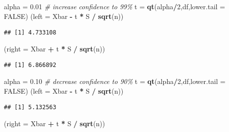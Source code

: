 \documentclass[
]{book}
\newenvironment{Shaded}{\begin{snugshade}}{\end{snugshade}}
\newcommand{\AttributeTok}[1]{\textcolor[rgb]{0.13,0.29,0.53}{#1}}
\newcommand{\CommentTok}[1]{\textcolor[rgb]{0.56,0.35,0.01}{\textit{#1}}}
\newcommand{\ConstantTok}[1]{\textcolor[rgb]{0.56,0.35,0.01}{#1}}
\newcommand{\DecValTok}[1]{\textcolor[rgb]{0.00,0.00,0.81}{#1}}
\newcommand{\FloatTok}[1]{\textcolor[rgb]{0.00,0.00,0.81}{#1}}
\newcommand{\FunctionTok}[1]{\textcolor[rgb]{0.13,0.29,0.53}{\textbf{#1}}}
\newcommand{\NormalTok}[1]{#1}
\newcommand{\OtherTok}[1]{\textcolor[rgb]{0.56,0.35,0.01}{#1}}
\newcommand{\SpecialCharTok}[1]{\textcolor[rgb]{0.81,0.36,0.00}{\textbf{#1}}}
\begin{document}
\begin{Shaded}
\begin{Highlighting}[]
\NormalTok{alpha }\OtherTok{=} \FloatTok{0.01} \CommentTok{\# increase confidence to 99\%}
\NormalTok{t }\OtherTok{=} \FunctionTok{qt}\NormalTok{(alpha}\SpecialCharTok{/}\DecValTok{2}\NormalTok{,df,}\AttributeTok{lower.tail =} \ConstantTok{FALSE}\NormalTok{)}
\NormalTok{(}\AttributeTok{left =}\NormalTok{ Xbar }\SpecialCharTok{{-}}\NormalTok{ t }\SpecialCharTok{*}\NormalTok{ S }\SpecialCharTok{/} \FunctionTok{sqrt}\NormalTok{(n))}
\end{Highlighting}
\end{Shaded}

\begin{verbatim}
## [1] 4.733108
\end{verbatim}

\begin{Shaded}
\begin{Highlighting}[]
\NormalTok{(}\AttributeTok{right =}\NormalTok{ Xbar }\SpecialCharTok{+}\NormalTok{ t }\SpecialCharTok{*}\NormalTok{ S }\SpecialCharTok{/} \FunctionTok{sqrt}\NormalTok{(n))}
\end{Highlighting}
\end{Shaded}

\begin{verbatim}
## [1] 6.866892
\end{verbatim}

\begin{Shaded}
\begin{Highlighting}[]
\NormalTok{alpha }\OtherTok{=} \FloatTok{0.10} \CommentTok{\# decrease confidence to 90\%}
\NormalTok{t }\OtherTok{=} \FunctionTok{qt}\NormalTok{(alpha}\SpecialCharTok{/}\DecValTok{2}\NormalTok{,df,}\AttributeTok{lower.tail =} \ConstantTok{FALSE}\NormalTok{)}
\NormalTok{(}\AttributeTok{left =}\NormalTok{ Xbar }\SpecialCharTok{{-}}\NormalTok{ t }\SpecialCharTok{*}\NormalTok{ S }\SpecialCharTok{/} \FunctionTok{sqrt}\NormalTok{(n))}
\end{Highlighting}
\end{Shaded}

\begin{verbatim}
## [1] 5.132563
\end{verbatim}

\begin{Shaded}
\begin{Highlighting}[]
\NormalTok{(}\AttributeTok{right =}\NormalTok{ Xbar }\SpecialCharTok{+}\NormalTok{ t }\SpecialCharTok{*}\NormalTok{ S }\SpecialCharTok{/} \FunctionTok{sqrt}\NormalTok{(n))}
\end{Highlighting}
\end{Shaded}
\end{document}
